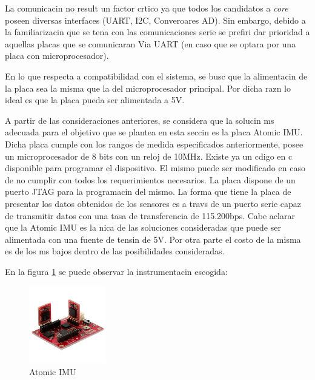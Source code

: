 \documentclass[spanish,12pt,a4paper,titlepage]{report}
\begin{document}
La comunicacin no result un factor crtico ya que todos los candidatos a \emph{core} poseen diversas interfaces (UART, I2C, Converoares AD). Sin embargo, debido a la familiarizacin que se tena con las comunicaciones serie se prefiri dar prioridad a aquellas placas que se comunicaran Via UART (en caso que se optara por una placa con microprocesador).

En lo que respecta a compatibilidad con el sistema, se busc que la alimentacin de la placa sea la misma que la del microprocesador principal. Por dicha razn lo ideal es que la placa pueda ser alimentada a 5V.

A partir de las consideraciones anteriores, se considera que la solucin ms adecuada para el objetivo que se plantea en esta seccin es la placa Atomic IMU. Dicha placa cumple con los rangos de medida especificados anteriormente, posee un microprocesador de 8 bits con un reloj de 10MHz. Existe ya un cdigo en c disponible para programar el dispositivo. El mismo puede ser modificado en caso de no cumplir con todos los requerimientos necesarios. La placa dispone de un puerto JTAG para la programacin del mismo. La forma que tiene la placa de presentar los datos obtenidos de los sensores es a travs de un puerto serie capaz de transmitir datos con una tasa de transferencia de 115.200bps. Cabe aclarar que la Atomic IMU es la nica de las soluciones consideradas que puede ser alimentada con una fuente de tensin de 5V. Por otra parte el costo de la misma es de los ms bajos dentro de las posibilidades consideradas.

En la figura \ref{fig:IMU} se puede observar la instrumentacin escogida:

\begin{figure}[h!]
	\centering
	\includegraphics[width=0.3\textwidth]{./pics_comparacion_hardware/IMU.jpg}
	\caption{Atomic IMU}
	\label{fig:IMU}
\end{figure}
\end{document}
